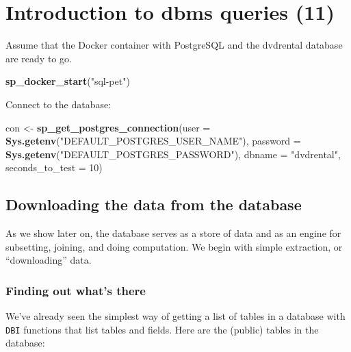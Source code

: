 \documentclass[]{book}
\newenvironment{Shaded}{\begin{snugshade}}{\end{snugshade}}
\newcommand{\DataTypeTok}[1]{\textcolor[rgb]{0.13,0.29,0.53}{#1}}
\newcommand{\DecValTok}[1]{\textcolor[rgb]{0.00,0.00,0.81}{#1}}
\newcommand{\KeywordTok}[1]{\textcolor[rgb]{0.13,0.29,0.53}{\textbf{#1}}}
\newcommand{\NormalTok}[1]{#1}
\newcommand{\StringTok}[1]{\textcolor[rgb]{0.31,0.60,0.02}{#1}}
\theoremstyle{definition}
\theoremstyle{definition}
\theoremstyle{definition}
\theoremstyle{remark}
\begin{document}
\hypertarget{introduction-to-dbms-queries-11}{%
\chapter{Introduction to dbms queries
(11)}\label{introduction-to-dbms-queries-11}}

Assume that the Docker container with PostgreSQL and the dvdrental
database are ready to go.

\begin{Shaded}
\begin{Highlighting}[]
\KeywordTok{sp_docker_start}\NormalTok{(}\StringTok{"sql-pet"}\NormalTok{)}
\end{Highlighting}
\end{Shaded}

Connect to the database:

\begin{Shaded}
\begin{Highlighting}[]
\NormalTok{con <-}\StringTok{ }\KeywordTok{sp_get_postgres_connection}\NormalTok{(}\DataTypeTok{user =} \KeywordTok{Sys.getenv}\NormalTok{(}\StringTok{"DEFAULT_POSTGRES_USER_NAME"}\NormalTok{),}
                         \DataTypeTok{password =} \KeywordTok{Sys.getenv}\NormalTok{(}\StringTok{"DEFAULT_POSTGRES_PASSWORD"}\NormalTok{),}
                         \DataTypeTok{dbname =} \StringTok{"dvdrental"}\NormalTok{,}
                         \DataTypeTok{seconds_to_test =} \DecValTok{10}\NormalTok{)}
\end{Highlighting}
\end{Shaded}

\hypertarget{downloading-the-data-from-the-database}{%
\section{Downloading the data from the
database}\label{downloading-the-data-from-the-database}}

As we show later on, the database serves as a store of data and as an
engine for subsetting, joining, and doing computation. We begin with
simple extraction, or ``downloading'' data.

\hypertarget{finding-out-whats-there}{%
\subsection{Finding out what's there}\label{finding-out-whats-there}}

We've already seen the simplest way of getting a list of tables in a
database with \texttt{DBI} functions that list tables and fields. Here
are the (public) tables in the database:
\end{document}
